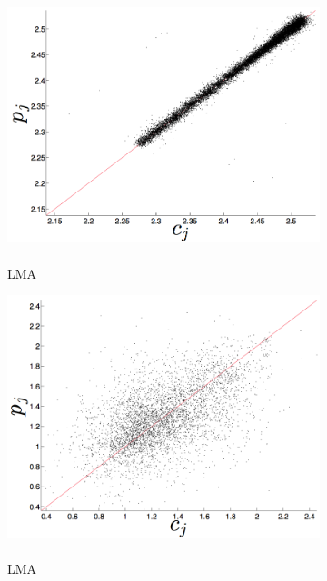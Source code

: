 \begin{figure}[htbp]
      \begin{subfigure}{0.6\columnwidth}
    \includegraphics[width=\columnwidth]{figs/colLMAForecast.png}
    \caption{\col \\ LMA}
    \label{fig:colLMA}
  \end{subfigure}
      \begin{subfigure}{0.6\columnwidth}
    \includegraphics[width=\columnwidth]{figs/gccLMAForecast.png}
    \caption{\gcc \\ LMA}
    \label{fig:gccLMA}
  \end{subfigure}  
        \begin{subfigure}{0.6\columnwidth}

\end{subfigure}
\end{figure}
